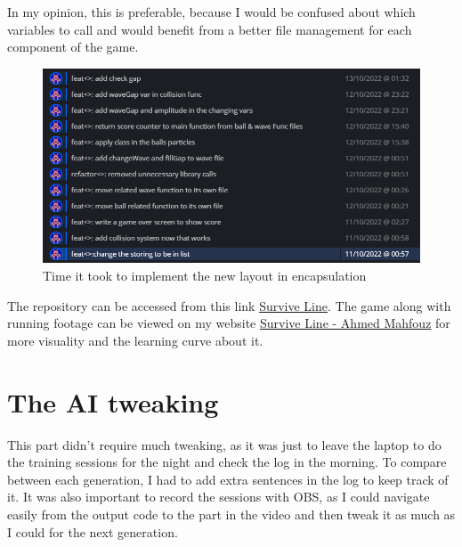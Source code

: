 In my opinion, this is preferable, because I would be confused about which variables to call and would benefit from a better file management for each component of the game. 
\begin{figure}[H]
	\centering
	\includegraphics[width=0.7\linewidth]{usedImages/repoEncapsulation}
	\caption[]{Time it took to implement the new layout in encapsulation}
	\label{fig:repoencapsulation}
\end{figure}

The repository can be accessed from this link \href{https://github.com/Ahelsamahy/Survive-Line}{Survive Line}. The game along with running footage can be viewed on my website \href{http://ahmedmahfouz.me/?p=thesis}{Survive Line - Ahmed Mahfouz} for more visuality and the learning curve about it.

\section{The AI tweaking}

This part didn't require much tweaking, as it was just to leave the laptop to do the training sessions for the night and check the log in the morning. To compare between each generation, I had to add extra  sentences in the log to keep track of it. It was also important to record the sessions with OBS, as I could navigate easily from the output code to the part in the video and then tweak it as much as I could for the next generation.

